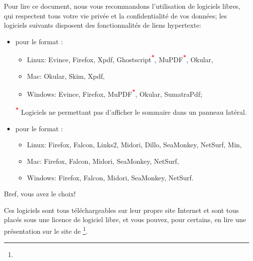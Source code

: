 Pour lire ce document, nous vous recommandons l'utilisation de logiciels libres, qui respectent tous votre vie privée et la confidentialité de vos données; les logiciels suivants disposent des fonctionnalités de \gls{liens hypertexte}: 
\begin{itemize}
	\item pour le format : 
		\begin{itemize}
				\item Linux: Evince, Firefox, Xpdf, Ghostscript\textsuperscript{\textcolor{red}{\textbf{*}}}, MuPDF\textsuperscript{\textcolor{red}{\textbf{*}}}, Okular,
				\item Mac: Okular, Skim, Xpdf,
				\item Windows: Evince, Firefox, MuPDF\textsuperscript{\textcolor{red}{\textbf{*}}}, Okular, SumatraPdf;
		\end{itemize}
		\textsuperscript{\textcolor{red}{\textbf{*}}} Logiciels ne permettant pas d'afficher le sommaire dans un panneau latéral.
	\item pour le format :
		\begin{itemize}
				\item Linux: Firefox, Falcon, Links2, Midori, Dillo, SeaMonkey, NetSurf, Min,
				\item Mac: Firefox, Falcon, Midori, SeaMonkey, NetSurf,
				\item Windows: Firefox, Falcon, Midori, SeaMonkey, NetSurf.
		\end{itemize}
\end{itemize}

Bref, vous avez le choix!

Ces logiciels sont tous téléchargeables sur leur propre site Internet et sont tous placés sous une licence de \gls{logiciel libre}, et vous pouvez, pour certains, en lire une présentation sur le site de \footnote{\urlFramasoftLogiciels{}}.
